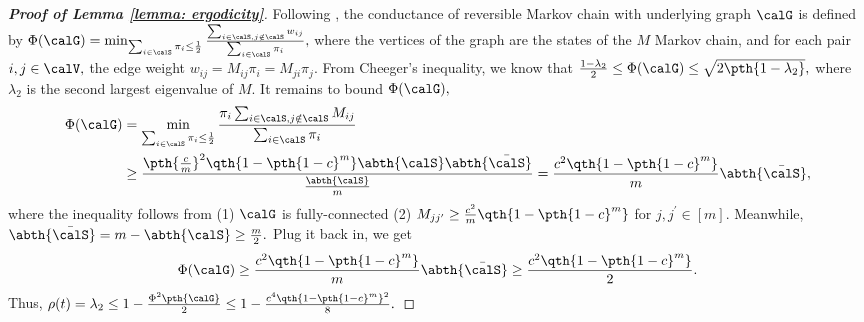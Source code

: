 \documentclass[letterpaper, 10 pt, conference]{ieeeconf}  %
\begin{document}
\begin{proof}[\bf Proof of Lemma \ref{lemma: ergodicity}]
Following \cite{jerrum1988conductance}, the conductance of reversible Markov chain with underlying graph $\calG$ is defined by
$
\Phi(\calG) = \min_{\sum_{i\in\calS} \pi_i \le \frac{1}{2}} \frac{\sum_{i\in\calS, j\notin \calS} w_{ij}}{\sum_{i\in \calS} \pi_i},
$
where the vertices of the graph are the states of the $M$ Markov chain, and for each pair $i,j\in \calV,$ the edge weight $w_{ij} = M_{ij} \pi_i = M_{ji} \pi_j.$ 
From Cheeger's inequality, we know that
$
\frac{1 - \lambda_2}{2} \le \Phi(\calG) \le \sqrt{2 \pth{1-\lambda_2}},
$
where $\lambda_2$ is the second largest eigenvalue of %
$M.$
It remains to bound $\Phi(\calG),$
\begin{align*}
    \Phi(\calG) 
    &= \min_{\sum_{i\in\calS} \pi_i \le \frac{1}{2}} \frac{\pi_i \sum_{i\in\calS, j\notin \calS} M_{ij}}{\sum_{i\in \calS} \pi_i}\\
    &\ge \frac{\pth{\frac{c}{m}}^2\qth{1-\pth{1-c}^m}\abth{\calS}\abth{\bar{\calS}}}{\frac{\abth{\calS}}{m}} = \frac{c^2\qth{1-\pth{1-c}^m}}{m} \abth{\bar{\calS}},
\end{align*}
where the inequality follows from (1) $\calG$ is fully-connected (2) $M_{j j^\prime}\ge \frac{c^2}{m} \qth{1-\pth{1-c}^m}$ for $j,j^\prime \in[m].$
Meanwhile,
$
\abth{\bar{\calS}} = m - \abth{\calS} \ge \frac{m}{2}.
$
Plug it back in, we get
\begin{align*}
    \Phi(\calG) 
    \ge \frac{c^2\qth{1-\pth{1-c}^m}}{m} \abth{\bar{\calS}} \ge \frac{c^2\qth{1-\pth{1-c}^m}}{2}.
\end{align*}
Thus,
$
    \rho(t) = \lambda_2 \le 1 - \frac{\Phi^2\pth{\calG}}{2} \le 1 - \frac{c^4\qth{1-\pth{1-c}^m}^2}{8}.
$
\end{proof}
\end{document}

